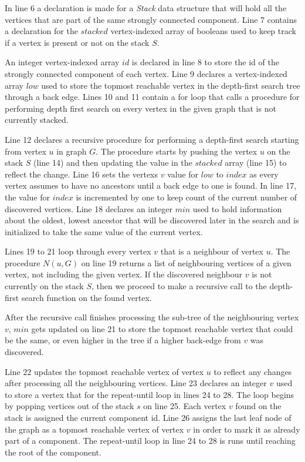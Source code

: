 \documentclass{l4proj}
\begin{document}
\noindent In line 6 a declaration is made for a \textit{Stack} data structure that will hold all the vertices that are part of the same strongly connected component. Line 7 contains a declaration for the $stacked$ vertex-indexed array of booleans used to keep track if a vertex is present or not on the stack $S$.

\noindent An integer vertex-indexed array $id$ is declared in line 8 to store the id of the strongly connected component of each vertex. Line 9 declares a vertex-indexed array $low$ used to store the topmost reachable vertex in the depth-first search tree through a back edge. Lines 10 and 11 contain a for loop that calls a procedure for performing depth first search on every vertex in the given graph that is not currently stacked.

\noindent Line 12 declares a recursive procedure for performing a depth-first search starting from vertex $u$ in graph $G$. The procedure starts by pushing the vertex $u$ on the stack $S$ (line 14) and then updating the value in the $stacked$ array (line 15) to reflect the change. Line 16 sets the vertex\textquotesingle s $v$ value for $low$ to $index$ as every vertex assumes to have no ancestors until a back edge to one is found. In line 17, the value for $index$ is incremented by one to keep count of the current number of discovered vertices. Line 18 declares an integer $min$ used to hold information about the oldest, lowest ancestor that will be discovered later in the search and is initialized to take the same value of the current vertex.

\noindent Lines 19 to 21 loop through every vertex $v$ that is a neighbour of vertex $u$. The procedure $N(u, G)$ on line 19 returns a list of neighbouring vertices of a given vertex, not including the given vertex. If the discovered neighbour $v$ is not currently on the stack $S$, then we proceed to make a recursive call to the depth-first search function on the found vertex.

\noindent After the recursive call finishes processing the sub-tree of the neighbouring vertex $v$, $min$ gets updated on line 21 to store the topmost reachable vertex that could be the same, or even higher in the tree if a higher back-edge from $v$ was discovered.

\noindent Line 22 updates the topmost reachable vertex of vertex $u$ to reflect any changes after processing all the neighbouring vertices. Line 23 declares an integer $v$ used to store a vertex that for the repeat-until loop in lines 24 to 28. The loop begins by popping vertices out of the stack $s$ on line 25. Each vertex $v$ found on the stack is assigned the current component id. Line 26 assigns the last leaf node of the graph as a topmost reachable vertex of vertex $v$ in order to mark it as already part of a component. The repeat-until loop in line 24 to 28 is runs until reaching the root of the component.
\end{document}
